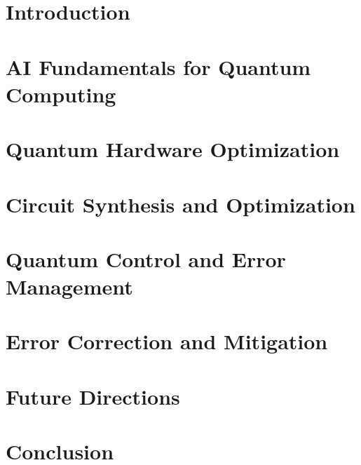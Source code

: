 \documentclass[conference]{IEEEtran}
\begin{document}
\section{Introduction}


\section{AI Fundamentals for Quantum Computing}


\section{Quantum Hardware Optimization}


\section{Circuit Synthesis and Optimization}


\section{Quantum Control and Error Management}


\section{Error Correction and Mitigation}



\section{Future Directions}


\section{Conclusion}


  
 
\end{document}
